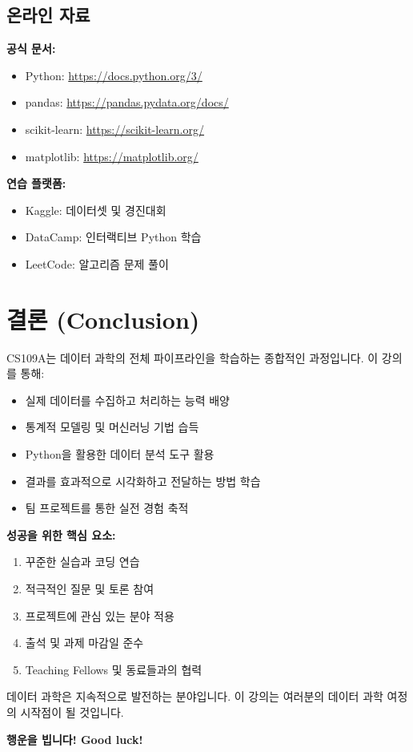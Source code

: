 \documentclass[12pt,a4paper]{article}
\begin{document}
\subsection{온라인 자료}

\textbf{공식 문서:}
\begin{itemize}
    \item Python: \url{https://docs.python.org/3/}
    \item pandas: \url{https://pandas.pydata.org/docs/}
    \item scikit-learn: \url{https://scikit-learn.org/}
    \item matplotlib: \url{https://matplotlib.org/}
\end{itemize}

\textbf{연습 플랫폼:}
\begin{itemize}
    \item Kaggle: 데이터셋 및 경진대회
    \item DataCamp: 인터랙티브 Python 학습
    \item LeetCode: 알고리즘 문제 풀이
\end{itemize}

\section{결론 (Conclusion)}

CS109A는 데이터 과학의 전체 파이프라인을 학습하는 종합적인 과정입니다. 이 강의를 통해:

\begin{itemize}
    \item 실제 데이터를 수집하고 처리하는 능력 배양
    \item 통계적 모델링 및 머신러닝 기법 습득
    \item Python을 활용한 데이터 분석 도구 활용
    \item 결과를 효과적으로 시각화하고 전달하는 방법 학습
    \item 팀 프로젝트를 통한 실전 경험 축적
\end{itemize}

\textbf{성공을 위한 핵심 요소:}
\begin{enumerate}
    \item 꾸준한 실습과 코딩 연습
    \item 적극적인 질문 및 토론 참여
    \item 프로젝트에 관심 있는 분야 적용
    \item 출석 및 과제 마감일 준수
    \item Teaching Fellows 및 동료들과의 협력
\end{enumerate}

데이터 과학은 지속적으로 발전하는 분야입니다. 이 강의는 여러분의 데이터 과학 여정의 시작점이 될 것입니다.

\vspace{1cm}

\textbf{행운을 빕니다! Good luck!}
\end{document}
